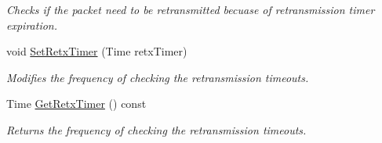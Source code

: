 \begin{DoxyCompactItemize}
\begin{DoxyCompactList}\small\item\em Checks if the packet need to be retransmitted becuase of retransmission timer expiration. \end{DoxyCompactList}\item 
void \hyperlink{classns3_1_1ndn_1_1Subscriber_a7a1eb7cc21e8a395d2339198ffa8fb25}{Set\+Retx\+Timer} (Time retx\+Timer)
\begin{DoxyCompactList}\small\item\em Modifies the frequency of checking the retransmission timeouts. \end{DoxyCompactList}\item 
Time \hyperlink{classns3_1_1ndn_1_1Subscriber_a80a0c94ded4df046ddcfb5f72ea3b6a7}{Get\+Retx\+Timer} () const
\begin{DoxyCompactList}\small\item\em Returns the frequency of checking the retransmission timeouts. \end{DoxyCompactList}\end{DoxyCompactItemize}
